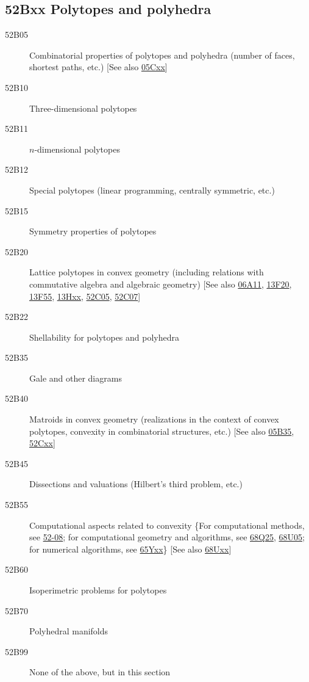 \documentclass[letterpaper]{article}
\begin{document}
\subsection*{52Bxx  Polytopes and polyhedra }\label{52Bxx}
\begin{description}  
\item [52B05]\label{52B05} Combinatorial properties of polytopes and polyhedra (number of faces, shortest paths, etc.) [See also \hyperref[05Cxx]{05Cxx}]
\item [52B10]\label{52B10} Three-dimensional polytopes
\item [52B11]\label{52B11} $n$-dimensional polytopes
\item [52B12]\label{52B12} Special polytopes (linear programming, centrally symmetric, etc.)
\item [52B15]\label{52B15} Symmetry properties of polytopes
\item [52B20]\label{52B20} Lattice polytopes in convex geometry (including relations with commutative algebra and algebraic geometry) [See also \hyperref[06A11]{06A11}, \hyperref[13F20]{13F20}, \hyperref[13F55]{13F55}, \hyperref[13Hxx]{13Hxx}, \hyperref[52C05]{52C05}, \hyperref[52C07]{52C07}]
\item [52B22]\label{52B22} Shellability for polytopes and polyhedra
\item [52B35]\label{52B35} Gale and other diagrams
\item [52B40]\label{52B40} Matroids in convex geometry (realizations in the context of convex polytopes, convexity in combinatorial structures, etc.) [See also \hyperref[05B35]{05B35}, \hyperref[52Cxx]{52Cxx}]
\item [52B45]\label{52B45} Dissections and valuations (Hilbert's third problem, etc.)
\item [52B55]\label{52B55} Computational aspects related to convexity \{For computational methods, see \hyperref[52-08]{52-08}; for computational geometry and algorithms, see \hyperref[68Q25]{68Q25}, \hyperref[68U05]{68U05}; for numerical algorithms, see \hyperref[65Yxx]{65Yxx}\} [See also \hyperref[68Uxx]{68Uxx}]
\item [52B60]\label{52B60} Isoperimetric problems for polytopes
\item [52B70]\label{52B70} Polyhedral manifolds
\item [52B99]\label{52B99} None of the above, but in this section
\end{description}
\end{document}
